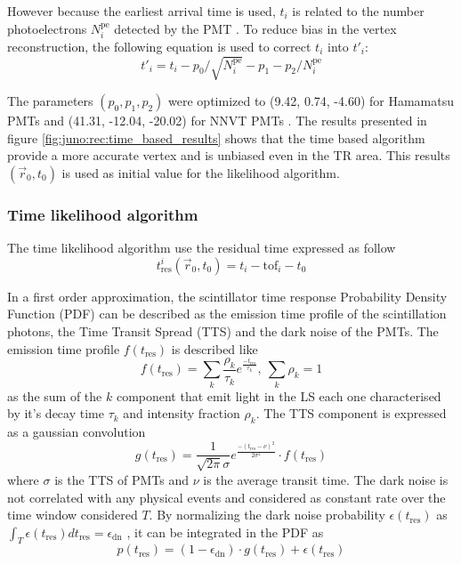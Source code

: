 \documentclass[../main.tex]{subfiles}
\begin{document}
However because the earliest arrival time is used, $t_i$ is related to the number photoelectrons $N_i^{\mathrm{pe}}$ detected by the PMT \cite{ranucci_analytical_1995, galbiati_time_2006, moszynski_status_1979}. To reduce bias in the vertex reconstruction, the following equation is used to correct $t_i$ into $t'_i$:
\begin{equation}
  t'_{i} = t_i - p_0 / \sqrt{N_i^{\mathrm{pe}}} - p_1 - p_2 / N_i^{\mathrm{pe}}
\end{equation}

The parameters $(p_0, p_1, p_2)$ were optimized to (9.42, 0.74, -4.60) for Hamamatsu PMTs and (41.31, -12.04, -20.02) for NNVT PMTs \cite{li_event_2021}. The results presented in figure \ref{fig:juno:rec:time_based_results} shows that the time based algorithm provide a more accurate vertex and is unbiased even in the TR area. This results $(\vec{r}_0, t_0)$ is used as initial value for the likelihood algorithm.

\subsubsection{Time likelihood algorithm}

The time likelihood algorithm use the residual time expressed as follow
\begin{equation}
  \label{eq:juno:rec:t_res}
  t_{\mathrm{res}}^i(\vec{r}_0, t_0) = t_i - \mathrm{tof}_i - t_0
\end{equation}

In a first order approximation, the scintillator time response Probability Density Function (PDF) can be described as the emission time profile of the scintillation photons, the Time Transit Spread (TTS) and the dark noise of the PMTs. The emission time profile $f(t_{\mathrm{res}})$ is described like
\begin{equation}
  f(t_{\mathrm{res}}) = \sum_k \frac{\rho_k}{\tau_k} e^{\frac{-t_{\mathrm{res}}}{\tau_k}}, ~ \sum_k \rho_k = 1
\end{equation}
as the sum of the $k$ component that emit light in the LS each one characterised by it's decay time $\tau_k$ and intensity fraction $\rho_k$. The TTS component is expressed as a gaussian convolution
\begin{equation}
  g(t_{\mathrm{res}}) = \frac{1}{\sqrt{2\pi}\sigma}e^{\frac{-(t_{\mathrm{res}} - \nu)^2}{2\sigma^2}} \cdot f(t_{\mathrm{res}})
\end{equation}
where $\sigma$ is the TTS of PMTs and $\nu$ is the average transit time. The dark noise is not correlated with any physical events and considered as constant rate over the time window considered $T$. By normalizing the dark noise probability $\epsilon(t_{\mathrm{res}})$ as $\int_T \epsilon(t_{\mathrm{res}}) dt_{\mathrm{res}} = \epsilon_{\mathrm{dn}}$ , it can be integrated in the PDF as
\begin{equation}
  \label{eq:juno:juno:tim_like:dn}
  p(t_{\mathrm{res}}) = (1-\epsilon_{\mathrm{dn}}) \cdot g(t_{\mathrm{res}}) + \epsilon(t_{\mathrm{res}})
\end{equation}
\end{document}
